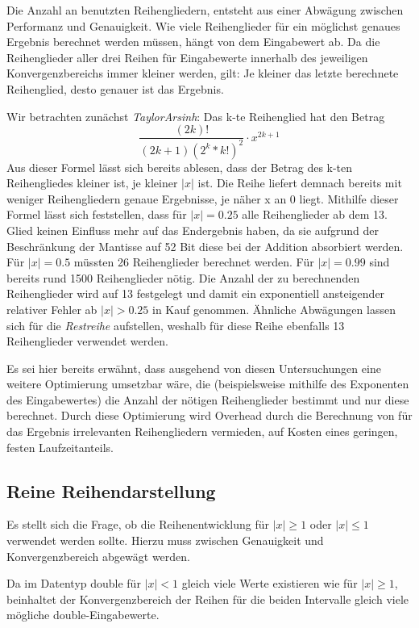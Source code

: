 \documentclass[course=erap] {aspdoc}
\begin{document}
    Die Anzahl an benutzten Reihengliedern, entsteht aus einer Abwägung zwischen Performanz und Genauigkeit.
    Wie viele Reihenglieder für ein möglichst genaues Ergebnis berechnet werden müssen, hängt von dem Eingabewert ab.
    Da die Reihenglieder aller drei Reihen für Eingabewerte innerhalb des jeweiligen Konvergenzbereichs immer kleiner werden, gilt:
    Je kleiner das letzte berechnete Reihenglied, desto genauer ist das Ergebnis.

    Wir betrachten zunächst \textit{TaylorArsinh}:
    Das k-te Reihenglied hat den Betrag
    \[
        \frac{(2k)!}{(2k + 1)(2^k*k!)^2}\cdot x^{2k+1}
    \]
    Aus dieser Formel lässt sich bereits ablesen, dass der Betrag des k-ten Reihengliedes kleiner ist, je kleiner $|x|$ ist.
    Die Reihe liefert demnach bereits mit weniger Reihengliedern genaue Ergebnisse, je näher x an 0 liegt.
    Mithilfe dieser Formel lässt sich feststellen, dass für $|x| = 0.25$ alle Reihenglieder ab dem 13. Glied keinen Einfluss mehr auf das Endergebnis haben, da sie aufgrund der Beschränkung der Mantisse auf 52 Bit diese bei der Addition absorbiert werden.
    Für $|x| = 0.5$ müssten 26 Reihenglieder berechnet werden.
    Für $|x| = 0.99$ sind bereits rund 1500 Reihenglieder nötig.
    Die Anzahl der zu berechnenden Reihenglieder wird auf 13 festgelegt und damit ein exponentiell ansteigender relativer Fehler ab $|x| > 0.25$ in Kauf genommen.
    Ähnliche Abwägungen lassen sich für die \textit{Restreihe} aufstellen, weshalb für diese Reihe ebenfalls 13 Reihenglieder verwendet werden.

    Es sei hier bereits erwähnt, dass ausgehend von diesen Untersuchungen eine weitere Optimierung umsetzbar wäre, die (beispielsweise mithilfe des Exponenten des Eingabewertes) die Anzahl der nötigen Reihenglieder bestimmt und nur diese berechnet.
    Durch diese Optimierung wird Overhead durch die Berechnung von für das Ergebnis irrelevanten Reihengliedern vermieden, auf Kosten eines geringen, festen Laufzeitanteils.

    \subsection{Reine Reihendarstellung}\label{subsec:reine-reihendarstellung}

    Es stellt sich die Frage, ob die Reihenentwicklung für $|x|\geq1$ oder $|x|\leq1$ verwendet werden sollte. Hierzu muss zwischen Genauigkeit und Konvergenzbereich abgewägt werden.

    Da im Datentyp double für $|x|<1$ gleich viele Werte existieren wie für $|x|\geq1$, beinhaltet der Konvergenzbereich der Reihen für die beiden Intervalle gleich viele mögliche double-Eingabewerte.
\end{document}
